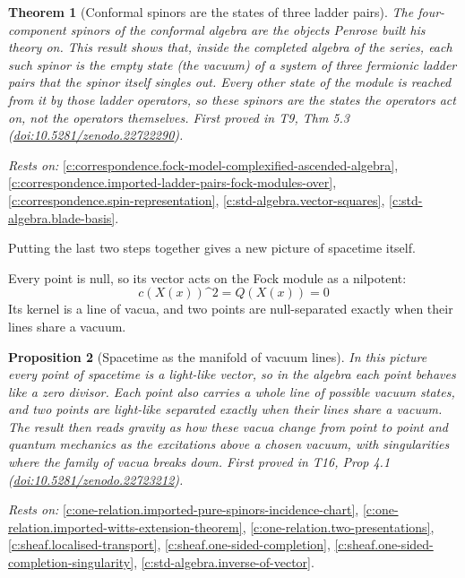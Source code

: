 \documentclass[11pt]{article}
\newtheorem{theorem}{Theorem}[section]
\newtheorem{proposition}[theorem]{Proposition}
\theoremstyle{definition}
\theoremstyle{plain}
\begin{document}
\begin{theorem}[Conformal spinors are the states of three ladder pairs]\label{c:correspondence.twistors-are-states-three-ladder-pairs}
The four-component spinors of the conformal algebra are the objects Penrose built his theory on. This result shows that, inside the completed algebra of the series, each such spinor is the empty state (the vacuum) of a system of three fermionic ladder pairs that the spinor itself singles out. Every other state of the module is reached from it by those ladder operators, so these spinors are the states the operators act on, not the operators themselves.
\emph{First proved in} T9, Thm 5.3 (\href{https://doi.org/10.5281/zenodo.22722290}{doi:10.5281/zenodo.22722290}).
\end{theorem}
\noindent\emph{Rests on:} \ref{c:correspondence.fock-model-complexified-ascended-algebra}, \ref{c:correspondence.imported-ladder-pairs-fock-modules-over}, \ref{c:correspondence.spin-representation}, \ref{c:std-algebra.vector-squares}, \ref{c:std-algebra.blade-basis}.

Putting the last two steps together gives a new picture of spacetime itself.

Every point is null, so its vector acts on the Fock module as a nilpotent: \[ c(X(x))\^{}{2} = Q(X(x)) = 0 \] Its kernel is a line of vacua, and two points are null-separated exactly when their lines share a vacuum.

\begin{proposition}[Spacetime as the manifold of vacuum lines]\label{c:one-relation.spacetime-manifold-vacuum-lines}
In this picture every point of spacetime is a light-like vector, so in the algebra each point behaves like a zero divisor. Each point also carries a whole line of possible vacuum states, and two points are light-like separated exactly when their lines share a vacuum. The result then reads gravity as how these vacua change from point to point and quantum mechanics as the excitations above a chosen vacuum, with singularities where the family of vacua breaks down.
\emph{First proved in} T16, Prop 4.1 (\href{https://doi.org/10.5281/zenodo.22723212}{doi:10.5281/zenodo.22723212}).
\end{proposition}
\noindent\emph{Rests on:} \ref{c:one-relation.imported-pure-spinors-incidence-chart}, \ref{c:one-relation.imported-witts-extension-theorem}, \ref{c:one-relation.two-presentations}, \ref{c:sheaf.localised-transport}, \ref{c:sheaf.one-sided-completion}, \ref{c:sheaf.one-sided-completion-singularity}, \ref{c:std-algebra.inverse-of-vector}.
\end{document}
